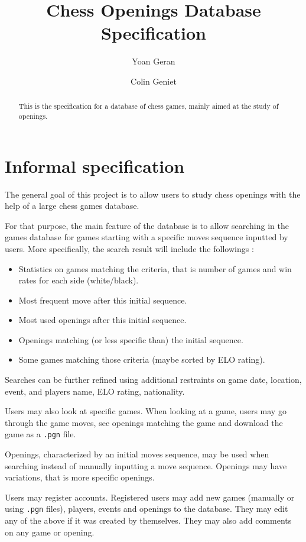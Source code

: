 \documentclass{article}
\begin{document}
\title{Chess Openings Database Specification}
\author{Yoan Geran \and Colin Geniet}
\maketitle

\begin{abstract}
This is the specification for a database of chess games, mainly aimed at
the study of openings.
\end{abstract}

\tableofcontents

\section{Informal specification}
The general goal of this project is to allow users to study chess openings
with the help of a large chess games database.

For that purpose, the main feature of the database is to allow searching
in the games database for games starting with a specific moves sequence
inputted by users.
More specifically, the search result will include the followings :
\begin{itemize}
\item Statistics on games matching the criteria, that is number of games and
win rates for each side (white/black).
\item Most frequent move after this initial sequence.
\item Most used openings after this initial sequence.
\item Openings matching (or less specific than) the initial sequence.
\item Some games matching those criteria (maybe sorted by ELO rating).
\end{itemize}

Searches can be further refined using additional restraints on game date, location,
event, and players name, ELO rating, nationality.

Users may also look at specific games.
When looking at a game, users may go through the game moves,
see openings matching the game and download the game as a \verb|.pgn| file.

Openings, characterized by an initial moves sequence, may be used when searching
instead of manually inputting a move sequence.
Openings may have variations, that is more specific openings.

Users may register accounts. Registered users may add new games (manually or using \verb|.pgn| files),
players, events and openings to the database. They may edit any of the above if it was
created by themselves. They may also add comments on any game or opening.
\end{document}
